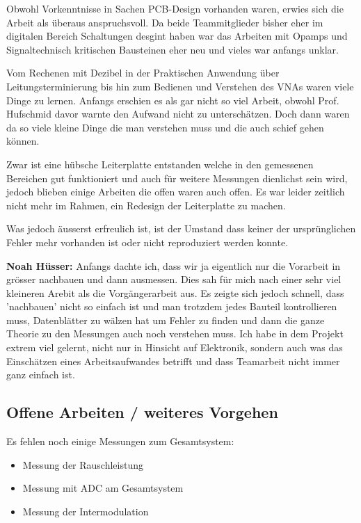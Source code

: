 Obwohl Vorkenntnisse in Sachen PCB-Design vorhanden waren, erwies sich die Arbeit als überaus anspruchsvoll. Da beide Teammitglieder bisher eher im digitalen Bereich Schaltungen desgint haben war das Arbeiten mit Opamps und Signaltechnisch kritischen Bausteinen eher neu und vieles war anfangs unklar.

Vom Rechenen mit Dezibel in der Praktischen Anwendung über Leitungsterminierung bis hin zum Bedienen und Verstehen des VNAs waren viele Dinge zu lernen. Anfangs erschien es als gar nicht so viel Arbeit, obwohl Prof. Hufschmid davor warnte den Aufwand nicht zu unterschätzen. Doch dann waren da so viele kleine Dinge die man verstehen muss und die auch schief gehen können.

Zwar ist eine hübsche Leiterplatte entstanden welche in den gemessenen Bereichen gut funktioniert und auch für weitere Messungen dienlichst sein wird, jedoch blieben einige Arbeiten die offen waren auch offen.
Es war leider zeitlich nicht mehr im Rahmen, ein Redesign der Leiterplatte zu machen.

Was jedoch äusserst erfreulich ist, ist der Umstand dass keiner der ursprünglichen Fehler mehr vorhanden ist oder nicht reproduziert werden konnte.

\textbf{Noah Hüsser:} Anfangs dachte ich, dass wir ja eigentlich nur die Vorarbeit in grösser nachbauen und dann ausmessen. Dies sah für mich nach einer sehr viel kleineren Arebit als die Vorgängerarbeit aus. Es zeigte sich jedoch schnell, dass 'nachbauen' nicht so einfach ist und man trotzdem jedes Bauteil kontrollieren muss, Datenblätter zu wälzen hat um Fehler zu finden und dann die ganze Theorie zu den Messungen auch noch verstehen muss. Ich habe in dem Projekt extrem viel gelernt, nicht nur in Hinsicht auf Elektronik, sondern auch was das Einschätzen eines Arbeitsaufwandes betrifft und dass Teamarbeit nicht immer ganz einfach ist.

\subsection*{Offene Arbeiten / weiteres Vorgehen}
Es fehlen noch einige Messungen zum Gesamtsystem:
\begin{itemize}
    \item Messung der Rauschleistung
    \item Messung mit ADC am Gesamtsystem
    \item Messung der Intermodulation
\end{itemize}

